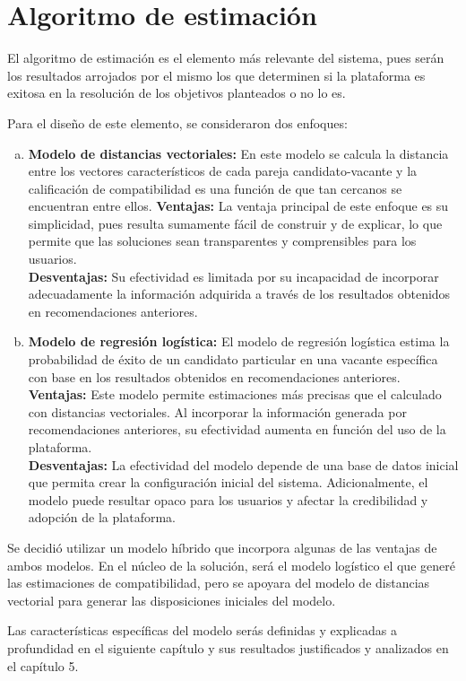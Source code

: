 	\section{Algoritmo de estimación}
		El algoritmo de estimación es el elemento más relevante del sistema, pues serán los resultados arrojados por el mismo los que determinen si la plataforma es exitosa en la resolución de los objetivos planteados o no lo es. 

		Para el diseño de este elemento, se consideraron dos enfoques: 
		\begin{enumerate}[(a)] 	
		    \item \textbf{Modelo de distancias vectoriales:}
		    	En este modelo se calcula la distancia entre los vectores característicos de cada pareja candidato-vacante y la calificación de compatibilidad es una función de que tan cercanos se encuentran entre ellos.
		    	\textbf{Ventajas:} La ventaja principal de este enfoque es su simplicidad, pues resulta sumamente fácil de construir y de explicar, lo que permite que las soluciones sean transparentes y comprensibles para los usuarios.\\ 
				\textbf{Desventajas:} Su efectividad es limitada por su incapacidad de incorporar adecuadamente la información adquirida a través de los resultados obtenidos en recomendaciones anteriores.
		    \item \textbf{Modelo de regresión logística:}
		    	El modelo de regresión logística estima la probabilidad de éxito de un candidato particular en una vacante específica con base en los resultados obtenidos en recomendaciones anteriores.
		    	\textbf{Ventajas:} Este modelo permite estimaciones más precisas que el calculado con distancias vectoriales. Al incorporar la información generada por recomendaciones anteriores, su efectividad aumenta en función del uso de la plataforma.\\ 
				\textbf{Desventajas:} La efectividad del modelo depende de una base de datos inicial que permita crear la configuración inicial del sistema. Adicionalmente, el modelo puede resultar opaco para los usuarios y afectar la credibilidad y adopción de la plataforma.
		\end{enumerate}

		Se decidió utilizar un modelo híbrido que incorpora algunas de las ventajas de ambos modelos. En el núcleo de la solución, será el modelo logístico el que generé las estimaciones de compatibilidad, pero se apoyara del modelo de distancias vectorial para generar las disposiciones iniciales del modelo.

		Las características específicas del modelo serás definidas y explicadas a profundidad en el siguiente capítulo y sus resultados justificados y analizados en el capítulo 5.
